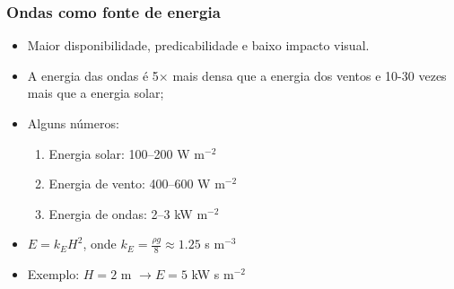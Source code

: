 \begin{frame}
    \frametitle{Ondas como fonte de energia}
        \footnotesize{
            \begin{itemize}[<+-| alert@+>]
                \item Maior disponibilidade, predicabilidade e baixo impacto
                      visual.
                \item A energia das ondas é 5$\times$ mais densa que a energia dos
                      ventos e 10-30 vezes mais que a energia solar;
                \item Alguns números:
                    \begin{enumerate}[<+-| alert@+>]
                        \item[] Energia solar: 100--200 W m$^{-2}$
                        \item[] Energia de vento: 400--600 W m$^{-2}$
                        \item[] Energia de ondas: 2--3 kW m$^{-2}$
                    \end{enumerate}
                \item $E = k_EH^2$, onde $k_E = \frac{\rho g}{8} \approx
                      1.25$ s m$^{-3}$
                \item Exemplo: $H = 2$ m $\rightarrow E = 5$ kW s m$^{-2}$
            \end{itemize}
            }
\end{frame}

